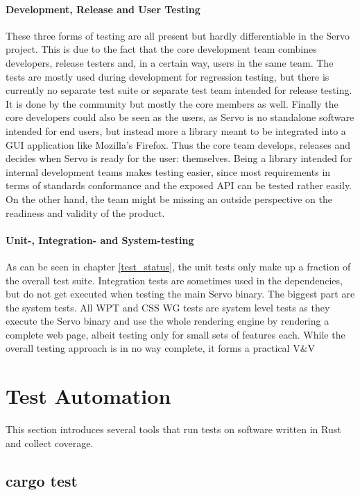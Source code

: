 \documentclass{scrartcl}
\begin{document}
\paragraph{Development, Release and User Testing}
These three forms of testing are all present but hardly differentiable in the Servo project. This is due to the fact that the core development team combines developers, release testers and, in a certain way, users in the same team. The tests are mostly used during development for regression testing, but there is currently no separate test suite or separate test team intended for release testing. It is done by the community but mostly the core members as well. Finally the core developers could also be seen as the users, as Servo is no standalone software intended for end users, but instead more a library meant to be integrated into a GUI application like Mozilla's Firefox. Thus the core team develops, releases and decides when Servo is ready for the user: themselves. Being a library intended for internal development teams makes testing easier, since most requirements in terms of standards conformance and the exposed API can be tested rather easily. On the other hand, the team might be missing an outside perspective on the readiness and validity of the product.

\paragraph{Unit-, Integration- and System-testing}
As can be seen in chapter \ref{test_status}, the unit tests only make up a fraction of the overall test suite. Integration tests are sometimes used in the dependencies, but do not get executed when testing the main Servo binary. The biggest part are the system tests. All WPT and CSS WG tests are system level tests as they execute the Servo binary and use the whole rendering engine by rendering a complete web page, albeit testing only for small sets of features each. While the overall testing approach is in no way complete, it forms a practical V\&V


\newpage


\section{Test Automation}

This section introduces several tools that run tests on software written in Rust and collect coverage.

\subsection{cargo test}
\end{document}
